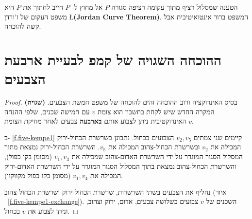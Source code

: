 
\begin{advanced}
הטענה שמסלול רציף מתוך עקומה רציפה סגורה 
$P$
אל מחוץ ל-%
$P$
חייב לחתוך את
$P$
היא משפט העקום של ז'ורדן 
\L{\textbf{(Jordan Curve Theorem)}}.
המשפט ברור אינטואיטיבית אבל קשה להוכחה.
\end{advanced}


\section{ההוכחה השגויה של קמפ לבעיית ארבעת הצבעים}
\label{s.kempe}

\begin{proof}
\textbf{(שגויה)}
בסיס האינדוקציה ורוב ההוכחה זהים להוכחה של משפט חמשת הצבעים. המקרה החדש שיש לקחת בחשבון הוא צומת 
$v$
עם חמישה שכנים, שלפי ההנחה האינדוקטיבית ניתן לצבוע אותם
\textbf{בארבעה}
צבעים לאחר מחיקת הצומת
$v$.

ב-%
\ref{f.five-kempe1}
קיימים שני צמתים
$v_2,v_5$
הצבועים בכחול. נתבונן בשרשרת הכחול-ירוק המכילה את 
$v_2$
ובשרשרת הכחול-צהוב המכילה את
$v_5$.
השרשרת הכחול-ירוק נמצאת מתוך המסלול הסגור המוגדר על ידי השרשרת האדום-צהוב שמכילה את
$v_1,v_3$
(מסומן בקו כפול), והשרשרת הכחול-צהוב נמצאת בתוך המסלול הסגור המוגדר על ידי השרשרת האדום-ירוק המכילה את
$v_1,v_4$
(מסומן בקו כפול מקווקוו).

נחליף את הצבעים בשתי השרשרות, שרשרת הכחול-ירוק ושרשרת הכחול-צהוב 
(איור%
~\ref{f.five-kempe1-exchange}).
השכנים של
$v$
צבועים בשלושה צבעים, אדום, ירוק וצהוב, וניתן לצבוע את
$v$
בכחול.
\end{proof}


